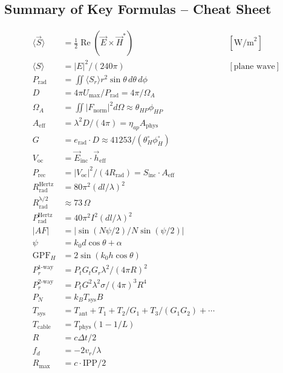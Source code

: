 \documentclass[10pt,letterpaper]{article}
\newcommand{\vE}{\vec{E}}
\newcommand{\vH}{\vec{H}}
\newcommand{\heff}{\vec{h}_{\mathrm{eff}}}
\newcommand{\Aeff}{A_{\mathrm{eff}}}
\newcommand{\Aphys}{A_{\mathrm{phys}}}
\newcommand{\Real}{\operatorname{Re}}
\begin{document}
\subsection{Summary of Key Formulas -- Cheat Sheet}

\begin{tcolorbox}[formulabox, title={Master Formula Sheet}]
\small
\begin{align*}
  \langle\vec{S}\rangle &= \tfrac{1}{2}\Real(\vE\times\vH^*) \quad &&[\text{W/m}^2] \\
  \langle S\rangle &= |E|^2/(240\pi) \quad &&[\text{plane wave}] \\
  P_\mathrm{rad} &= \iint\langle S_r\rangle r^2\sin\theta\,d\theta\,d\phi \\
  D &= 4\pi U_\mathrm{max}/P_\mathrm{rad} = 4\pi/\Omega_A \\
  \Omega_A &= \iint|F_\mathrm{norm}|^2d\Omega \approx\theta_{HP}\phi_{HP} \\
  \Aeff &= \lambda^2 D/(4\pi) = \eta_{ap}\Aphys \\
  G &= e_\mathrm{rad}\cdot D \approx 41253/(\theta_H^\circ\phi_H^\circ) \\
  V_\mathrm{oc} &= \vE_\mathrm{inc}\cdot\heff \\
  P_\mathrm{rec} &= |V_\mathrm{oc}|^2/(4R_\mathrm{rad}) = S_\mathrm{inc}\cdot\Aeff \\
  R_\mathrm{rad}^\mathrm{Hertz} &= 80\pi^2(dl/\lambda)^2 \\
  R_\mathrm{rad}^\mathrm{\lambda/2} &\approx73\,\Omega \\
  P_\mathrm{rad}^\mathrm{Hertz} &= 40\pi^2 I^2(dl/\lambda)^2 \\
  |AF| &= |\sin(N\psi/2)/N\sin(\psi/2)| \\
  \psi &= k_0 d\cos\theta+\alpha \\
  \mathrm{GPF}_H &= 2\sin(k_0 h\cos\theta) \\
  P_r^{1\text{-way}} &= P_t G_t G_r\lambda^2/(4\pi R)^2 \\
  P_r^{2\text{-way}} &= P_t G^2\lambda^2\sigma/(4\pi)^3R^4 \\
  P_N &= k_B T_\mathrm{sys}B \\
  T_\mathrm{sys} &= T_\mathrm{ant}+T_1+T_2/G_1+T_3/(G_1G_2)+\cdots \\
  T_\mathrm{cable} &= T_\mathrm{phys}(1-1/L) \\
  R &= c\Delta t/2 \\
  f_d &= -2v_r/\lambda \\
  R_\mathrm{max} &= c\cdot\mathrm{IPP}/2 \\

\end{align*}
\end{tcolorbox}
\end{document}
